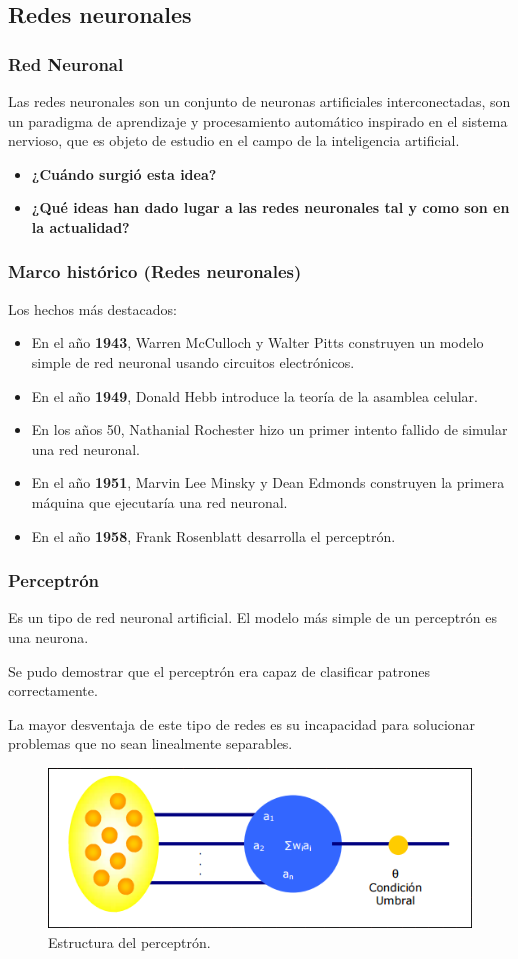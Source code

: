\documentclass[9pt]{beamer} %
\begin{document}
	\subsection{Redes neuronales}
		
		\begin{frame}
		\frametitle{Red Neuronal}
		Las redes neuronales son un conjunto de neuronas artificiales interconectadas, son un paradigma de aprendizaje y procesamiento automático inspirado en el sistema nervioso, que es objeto de estudio en el campo de la inteligencia artificial.
		\begin{itemize}
		\item \textbf{¿Cuándo surgió esta idea?}
		\item \textbf{¿Qué ideas han dado lugar a las redes neuronales tal y como son en la actualidad?}
		\end{itemize}	
		\end{frame}
	
		\begin{frame}
		\frametitle{Marco histórico (Redes neuronales)}
			Los hechos más destacados:
			\begin{itemize}
				\item En el año \textbf{1943}, Warren McCulloch y Walter Pitts construyen un modelo simple de red neuronal usando circuitos electrónicos. 
				\item En el año \textbf{1949}, Donald Hebb introduce la teoría de la asamblea celular.
				\item En los años 50, Nathanial Rochester hizo un primer intento fallido de simular una red neuronal.
				\item En el año \textbf{1951}, Marvin Lee Minsky y Dean Edmonds construyen la primera máquina que ejecutaría una red neuronal.
				\item En el año \textbf{1958}, Frank Rosenblatt desarrolla el perceptrón.
			\end{itemize}
		\end{frame}	
	
		\begin{frame}
		\frametitle{Perceptrón}
Es un tipo de red neuronal artificial. El modelo más simple de un perceptrón es una neurona. 

Se pudo demostrar que el perceptrón era capaz de clasificar patrones correctamente.
		
	La mayor desventaja de este tipo de redes es su incapacidad para solucionar problemas que no sean linealmente separables.
		\begin{figure}
		\includegraphics[scale=0.55]{Perceptron.PNG}
		\caption{Estructura del perceptrón.} 
		\end{figure}
		\end{frame}	
		
\end{document}
